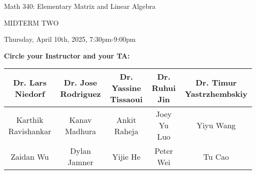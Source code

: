 \documentclass[12pt]{extarticle}
\begin{document}
\LARGE{Math 340: Elementary Matrix and Linear Algebra}

\bigskip

\Huge{MIDTERM TWO} \normalsize

\bigskip

Thursday, April 10th, 2025, 7:30pm-9:00pm
\vspace{.12in}

\textbf{Circle your Instructor and your TA:}

\begin{table}[h]\centering \small
\begin{tabular}{|c|c|c|c|c|}
\hline
Dr. Lars Niedorf &  Dr. Jose Rodriguez & Dr. Yassine Tissaoui & Dr. Ruhui Jin & Dr. Timur Yastrzhembskiy \\ \hline
Karthik Ravishankar & Kanav Madhura & Ankit Raheja & Joey Yu Luo & Yiyu Wang\\ \hline
Zaidan Wu & Dylan Jamner & Yijie He & Peter Wei & Tu Cao\\ \hline

\end{tabular}
\end{table}






\vspace{-.2in}
\end{document}
